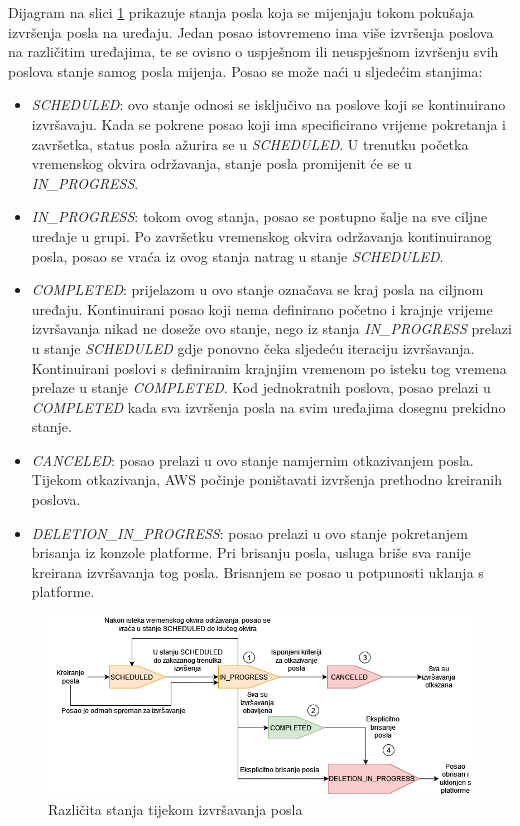 Dijagram na slici \ref{fig:job_states} prikazuje stanja posla koja se mijenjaju tokom pokušaja izvršenja posla na uređaju. Jedan posao istovremeno ima više izvršenja poslova na različitim uređajima, te se ovisno o uspješnom ili neuspješnom izvršenju svih poslova stanje samog posla mijenja. Posao se može naći u sljedećim stanjima:
\begin{itemize}
	\item \textit{SCHEDULED}: ovo stanje odnosi se isključivo na poslove koji se kontinuirano izvršavaju. Kada se pokrene posao koji ima specificirano vrijeme pokretanja i završetka, status posla ažurira se u \textit{SCHEDULED}. U trenutku početka vremenskog okvira održavanja, stanje posla promijenit će se u \textit{IN\_PROGRESS}.
	\item \textit{IN\_PROGRESS}: tokom ovog stanja, posao se postupno šalje na sve ciljne uređaje u grupi. Po završetku vremenskog okvira održavanja kontinuiranog posla, posao se vraća iz ovog stanja natrag u stanje \textit{SCHEDULED}.
	\item \textit{COMPLETED}: prijelazom u ovo stanje označava se kraj posla na ciljnom uređaju. Kontinuirani posao koji nema definirano početno i krajnje vrijeme izvršavanja nikad ne doseže ovo stanje, nego iz stanja \textit{IN\_PROGRESS} prelazi u stanje \textit{SCHEDULED} gdje ponovno čeka sljedeću iteraciju izvršavanja. Kontinuirani poslovi s definiranim krajnjim vremenom po isteku tog vremena prelaze u stanje \textit{COMPLETED}. Kod jednokratnih poslova, posao prelazi u \textit{COMPLETED} kada sva izvršenja posla na svim uređajima dosegnu prekidno stanje. 
	\item \textit{CANCELED}: posao prelazi u ovo stanje namjernim otkazivanjem posla. Tijekom otkazivanja, AWS počinje poništavati izvršenja prethodno kreiranih poslova.
	\item \textit{DELETION\_IN\_PROGRESS}: posao prelazi u ovo stanje pokretanjem brisanja iz konzole platforme. Pri brisanju posla, usluga briše sva ranije kreirana izvršavanja tog posla. Brisanjem se posao u potpunosti uklanja s platforme. 
\end{itemize}

\begin{figure}[ht]
	\centering
	\includegraphics[scale=0.5]{imgs/job_states}
	\caption{Različita stanja tijekom izvršavanja posla \cite{aws_docs}}
	\label{fig:job_states}
\end{figure}

